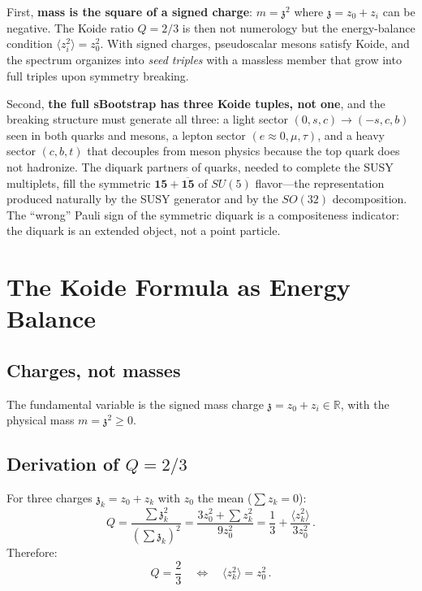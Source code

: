 \documentclass[12pt,a4paper]{article}
\newcommand{\zch}{\mathfrak{z}}
\begin{document}
First, \textbf{mass is the square of a signed charge}: $m = \zch^2$ 
where $\zch = z_0 + z_i$ can be negative. The Koide ratio $Q = 2/3$ 
is then not numerology but the energy-balance condition 
$\langle z_i^2\rangle = z_0^2$. With signed charges, pseudoscalar 
mesons satisfy Koide, and the spectrum organizes into \emph{seed 
triples} with a massless member that grow into full triples upon 
symmetry breaking.

Second, \textbf{the full sBootstrap has three Koide tuples, not one}, 
and the breaking structure must generate all three: a light sector 
$(0,s,c) \to (-s,c,b)$ seen in both quarks and mesons, a lepton 
sector $(e\!\approx\!0, \mu, \tau)$, and a heavy sector $(c,b,t)$ 
that decouples from meson physics because the top quark does not 
hadronize. The diquark partners of quarks, needed to complete the 
SUSY multiplets, fill the symmetric $\mathbf{15} + \overline{\mathbf{15}}$ 
of $SU(5)$ flavor---the representation produced naturally by the 
SUSY generator and by the $SO(32)$ decomposition. The ``wrong'' 
Pauli sign of the symmetric diquark is a compositeness indicator: 
the diquark is an extended object, not a point particle.

\section{The Koide Formula as Energy Balance}
\label{sec:koide_algebra}

\subsection{Charges, not masses}

The fundamental variable is the signed mass charge $\zch = z_0 + z_i 
\in \mathbb{R}$, with the physical mass $m = \zch^2 \geq 0$.

\subsection{Derivation of $Q = 2/3$}

For three charges $\zch_k = z_0 + z_k$ with $z_0$ the mean 
($\sum z_k = 0$):
\begin{equation}
Q = \frac{\sum \zch_k^2}{(\sum \zch_k)^2} 
= \frac{3z_0^2 + \sum z_k^2}{9z_0^2}
= \frac{1}{3} + \frac{\langle z_k^2\rangle}{3z_0^2}\,.
\end{equation}
Therefore:
\begin{equation}
\boxed{Q = \frac{2}{3} \quad\Longleftrightarrow\quad 
\langle z_k^2\rangle = z_0^2\,.}
\end{equation}
\end{document}
